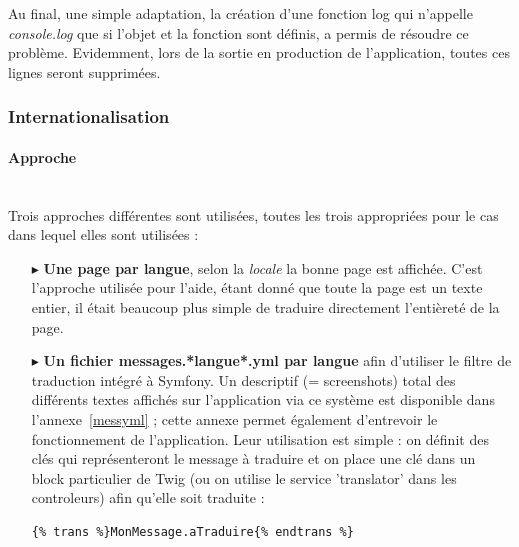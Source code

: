\documentclass{article}
\begin{document}
\begin{sffamily}
Au final, une simple adaptation, la création d'une fonction log qui n'appelle \textit{console.log} que si l'objet et la fonction sont définis, a permis de résoudre ce 
problème. Evidemment, lors de la sortie en production de l'application, toutes ces lignes seront supprimées.

\newpage

\subsubsection{Internationalisation}

\paragraph{Approche}$ $\\

Trois approches différentes sont utilisées, toutes les trois appropriées pour le cas dans lequel elles sont utilisées :
\begin{itemize}
\item[$\blacktriangleright$]\textbf{Une page par langue}, selon la \textit{locale} la bonne page est affichée. C'est l'approche utilisée pour l'aide, étant donné que toute 
la page est un texte entier, il était beaucoup plus simple de traduire directement l'entièreté de la page.\\

\item[$\blacktriangleright$]\textbf{Un fichier messages.*langue*.yml par langue} afin d'utiliser le filtre de traduction intégré à Symfony. Un descriptif (= screenshots) 
total des différents textes affichés sur l'application via ce système est disponible dans l'annexe~\ref{messyml} ; cette annexe permet également d'entrevoir le 
fonctionnement de l'application. Leur utilisation est simple : on définit des clés qui 
représenteront le message à traduire et on place une clé dans un block particulier de Twig (ou on utilise le service 'translator' dans les controleurs) afin qu'elle soit 
traduite : \\

\begin{verbatim}
{% trans %}MonMessage.aTraduire{% endtrans %}
\end{verbatim}
$ $\\


\end{itemize}
\end{sffamily}
\end{document}
